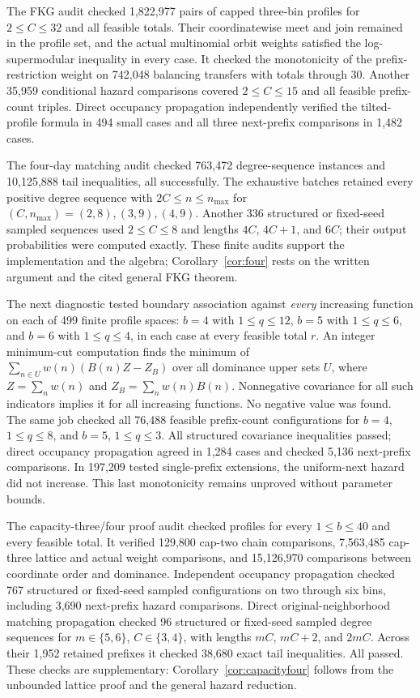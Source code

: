 \documentclass[11pt]{article}
\begin{document}
The FKG audit checked 1,822,977 pairs of capped three-bin profiles
for $2\leq C\leq32$ and all feasible totals. Their coordinatewise
meet and join remained in the profile set, and the actual multinomial
orbit weights satisfied the log-supermodular inequality in every case.
It checked the monotonicity of the prefix-restriction weight on
742,048 balancing transfers with totals through 30. Another 35,959
conditional hazard comparisons covered $2\leq C\leq15$ and all
feasible prefix-count triples. Direct occupancy propagation independently
verified the tilted-profile formula in 494 small cases and all three
next-prefix comparisons in 1,482 cases.

The four-day matching audit checked 763,472 degree-sequence instances
and 10,125,888 tail inequalities, all successfully. The exhaustive
batches retained every positive degree sequence with
$2C\leq n\leq n_{\max}$ for $(C,n_{\max})=(2,8),(3,9),(4,9)$.
Another 336 structured or fixed-seed sampled sequences used
$2\leq C\leq8$ and lengths $4C$, $4C+1$, and $6C$; their output
probabilities were computed exactly. These finite audits support the
implementation and the algebra; Corollary~\ref{cor:four} rests on the
written argument and the cited general FKG theorem.

The next diagnostic tested boundary association against \emph{every}
increasing function on each of 499 finite profile spaces: $b=4$ with
$1\leq q\leq12$, $b=5$ with $1\leq q\leq6$, and $b=6$ with
$1\leq q\leq4$, in each case at every feasible total $r$.
An integer minimum-cut computation finds the minimum of
$\sum_{n\in U}w(n)(B(n)Z-Z_B)$ over all dominance upper sets $U$,
where $Z=\sum_n w(n)$ and $Z_B=\sum_n w(n)B(n)$.
Nonnegative covariance for all such indicators implies it for all
increasing functions. No negative value was found. The same job
checked all 76,488 feasible prefix-count configurations for
$b=4$, $1\leq q\leq8$, and $b=5$, $1\leq q\leq3$.
All structured covariance inequalities passed; direct occupancy
propagation agreed in 1,284 cases and checked 5,136 next-prefix
comparisons. In 197,209 tested single-prefix extensions, the
uniform-next hazard did not increase. This last monotonicity remains
unproved without parameter bounds.

The capacity-three/four proof audit checked profiles for every
$1\leq b\leq40$ and every feasible total. It verified 129,800
cap-two chain comparisons, 7,563,485 cap-three lattice and actual
weight comparisons, and 15,126,970 comparisons between coordinate
order and dominance. Independent occupancy propagation checked
767 structured or fixed-seed sampled configurations on two through
six bins, including 3,690 next-prefix hazard comparisons.
Direct original-neighborhood matching propagation checked 96
structured or fixed-seed sampled degree sequences for
$m\in\{5,6\}$, $C\in\{3,4\}$, with lengths $mC$, $mC+2$,
and $2mC$. Across their 1,952 retained prefixes it checked
38,680 exact tail inequalities. All passed. These checks are
supplementary: Corollary~\ref{cor:capacityfour} follows from the
unbounded lattice proof and the general hazard reduction.
\end{document}
